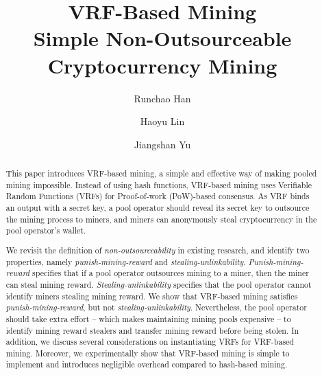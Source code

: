 \documentclass[runningheads]{llncs}
\begin{document}
\title{
  VRF-Based Mining\\
  \large Simple Non-Outsourceable Cryptocurrency Mining
}


\author{%
Runchao Han  \and 
Haoyu Lin \and
Jiangshan Yu
}

\maketitle

\begin{abstract}
  This paper introduces VRF-based mining, a simple and effective way of making pooled mining impossible.
  Instead of using hash functions, VRF-based mining uses Verifiable Random Functions (VRFs) for Proof-of-work (PoW)-based consensus.
  As VRF binds an output with a secret key, a pool operator should reveal its secret key to outsource the mining process to miners, and miners can anonymously steal cryptocurrency in the pool operator's wallet.
  
  We revisit the definition of \emph{non-outsourceability} in existing research, and identify two properties, namely \emph{punish-mining-reward} and \emph{stealing-unlinkability}.
  \emph{Punish-mining-reward} specifies that if a pool operator outsources mining to a miner, then the miner can steal mining reward.
  \emph{Stealing-unlinkability} specifies that the pool operator cannot identify miners stealing mining reward.
  We show that VRF-based mining satisfies \emph{punish-mining-reward}, but not \emph{stealing-unlinkability}.
  Nevertheless, the pool operator should take extra effort -- which makes maintaining mining pools expensive -- to identify mining reward stealers and transfer mining reward before being stolen.
  In addition, we discuss several considerations on instantiating VRFs for VRF-based mining.
  Moreover, we experimentally show that VRF-based mining is simple to implement and introduces negligible overhead compared to hash-based mining.
\end{abstract}















\appendix

\end{document}

